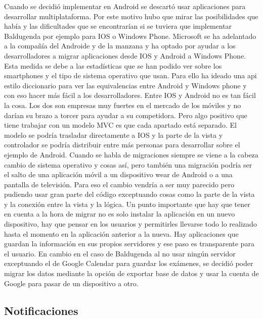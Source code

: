 Cuando se decidió implementar en Android se descartó usar aplicaciones para desarrollar multiplataforma. 
Por este motivo hubo que mirar las posibilidades que había y las dificultades que se encontrarían si se tuviera que implementar Baldugenda por ejemplo para IOS o Windows Phone.
Microsoft se ha adelantado a la compañía del Androide y de la manzana y ha optado por ayudar a los desarrolladores a migrar aplicaciones desde IOS y Android a Windows Phone.
Esta medida se debe a las estadísticas que se han podido ver sobre los smartphones y el tipo de sistema operativo que usan. 
Para ello ha ideado una api estilo diccionario para ver las equivalencias entre Android y Windows phone y con eso hacer más fácil a los desarrolladores.
Entre IOS y Android no es tan fácil la cosa. Los dos son empresas muy fuertes en el mercado de los móviles y no darían su brazo a torcer para ayudar a su competidora. 
Pero algo positivo que tiene trabajar con un modelo MVC es que cada apartado está separado.
El modelo se podría trasladar directamente a IOS y la parte de la vista y controlador se podría distribuir entre más personas para desarrollar sobre el ejemplo de Android.
Cuando se habla de migraciones siempre se viene a la cabeza cambio de sistema operativo y cosas así, pero también una migración podría ser el salto de una aplicación móvil a un dispositivo wear de Android o a una pantalla de televisión. Para eso el cambio vendría a ser muy parecido pero pudiendo usar gran parte del código exceptuando cosas como la parte de la vista y la conexión entre la vista y la lógica.
Un punto importante que hay que tener en cuenta a la hora de migrar no es solo instalar la aplicación en un nuevo dispositivo, hay que pensar en los usuarios y permitirles llevarse todo lo realizado hasta el momento en la aplicación anterior a la nueva.
Hay aplicaciones que guardan la información en sus propios servidores y ese paso es transparente para el usuario.
En cambio en el caso de Baldugenda al no usar ningún servidor exceptuando el de Google Calendar para guardar los exámenes, se decidió poder migrar los datos mediante la opción de exportar base de datos y usar la cuenta de Google para pasar de un dispositivo a otro.

\subsection{Notificaciones}
\label{subsecc:Notificaciones}

